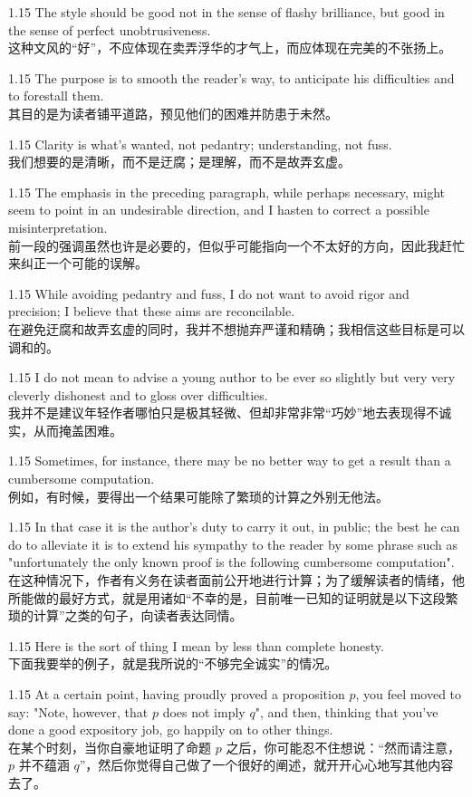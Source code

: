 \documentclass[12pt,a4paper]{article}
\newcommand{\bilingual}[2]{
    \begin{spacing}{1.15} %
        \noindent \normalsize #1 \\[-0.5ex] %
        \small \textcolor{blue!70!black}{#2} %
    \end{spacing}
    \vspace{0.8em} %
}
\begin{document}
\bilingual{The style should be good not in the sense of flashy brilliance, but good in the sense of perfect unobtrusiveness.}
{这种文风的“好”，不应体现在卖弄浮华的才气上，而应体现在完美的不张扬上。} %

\bilingual{The purpose is to smooth the reader's way, to anticipate his difficulties and to forestall them.}
{其目的是为读者铺平道路，预见他们的困难并防患于未然。} %

\bilingual{Clarity is what's wanted, not pedantry; understanding, not fuss.}
{我们想要的是清晰，而不是迂腐；是理解，而不是故弄玄虚。} %

\bilingual{The emphasis in the preceding paragraph, while perhaps necessary, might seem to point in an undesirable direction, and I hasten to correct a possible misinterpretation.}
{前一段的强调虽然也许是必要的，但似乎可能指向一个不太好的方向，因此我赶忙来纠正一个可能的误解。} %

\bilingual{While avoiding pedantry and fuss, I do not want to avoid rigor and precision; I believe that these aims are reconcilable.}
{在避免迂腐和故弄玄虚的同时，我并不想抛弃严谨和精确；我相信这些目标是可以调和的。} %

\bilingual{I do not mean to advise a young author to be ever so slightly but very very cleverly dishonest and to gloss over difficulties.}
{我并不是建议年轻作者哪怕只是极其轻微、但却非常非常“巧妙”地去表现得不诚实，从而掩盖困难。} %

\bilingual{Sometimes, for instance, there may be no better way to get a result than a cumbersome computation.}
{例如，有时候，要得出一个结果可能除了繁琐的计算之外别无他法。} %

\bilingual{In that case it is the author's duty to carry it out, in public; the best he can do to alleviate it is to extend his sympathy to the reader by some phrase such as "unfortunately the only known proof is the following cumbersome computation".}
{在这种情况下，作者有义务在读者面前公开地进行计算；为了缓解读者的情绪，他所能做的最好方式，就是用诸如“不幸的是，目前唯一已知的证明就是以下这段繁琐的计算”之类的句子，向读者表达同情。} %

\bilingual{Here is the sort of thing I mean by less than complete honesty.}
{下面我要举的例子，就是我所说的“不够完全诚实”的情况。} %

\bilingual{At a certain point, having proudly proved a proposition $p$, you feel moved to say: "Note, however, that $p$ does not imply $q$", and then, thinking that you've done a good expository job, go happily on to other things.}
{在某个时刻，当你自豪地证明了命题 $p$ 之后，你可能忍不住想说：“然而请注意，$p$ 并不蕴涵 $q$”，然后你觉得自己做了一个很好的阐述，就开开心心地写其他内容去了。} %
\end{document}
